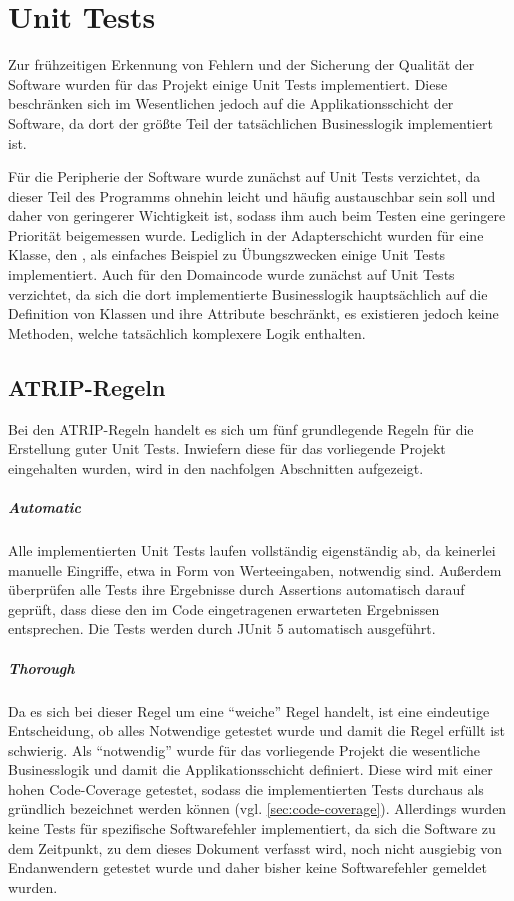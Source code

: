 \chapter{Unit Tests}
Zur frühzeitigen Erkennung von Fehlern und der Sicherung der Qualität der Software wurden für das Projekt einige Unit Tests implementiert. Diese beschränken sich im Wesentlichen jedoch auf die Applikationsschicht der Software, da dort der größte Teil der tatsächlichen Businesslogik implementiert ist. 

Für die Peripherie der Software wurde zunächst auf Unit Tests verzichtet, da dieser Teil des Programms ohnehin leicht und häufig austauschbar sein soll und daher von geringerer Wichtigkeit ist, sodass ihm auch beim Testen eine geringere Priorität beigemessen wurde. Lediglich in der Adapterschicht wurden für eine Klasse, den , als einfaches Beispiel zu Übungszwecken einige Unit Tests implementiert. Auch für den Domaincode wurde zunächst auf Unit Tests verzichtet, da sich die dort implementierte Businesslogik hauptsächlich auf die Definition von Klassen und ihre Attribute beschränkt, es existieren jedoch keine Methoden, welche tatsächlich komplexere Logik enthalten.

\section{ATRIP-Regeln}
Bei den ATRIP-Regeln handelt es sich um fünf grundlegende Regeln für die Erstellung guter Unit Tests. Inwiefern diese für das vorliegende Projekt eingehalten wurden, wird in den nachfolgen Abschnitten aufgezeigt.

\paragraph{Automatic} Alle implementierten Unit Tests laufen vollständig eigenständig ab, da keinerlei manuelle Eingriffe, etwa in Form von Werteeingaben, notwendig sind. Außerdem überprüfen alle Tests ihre Ergebnisse durch Assertions automatisch darauf geprüft, dass diese den im Code eingetragenen erwarteten Ergebnissen entsprechen. Die Tests werden durch JUnit 5 automatisch ausgeführt.

\paragraph{Thorough} Da es sich bei dieser Regel um eine \enquote{weiche} Regel handelt, ist eine eindeutige Entscheidung, ob alles Notwendige getestet wurde und damit die Regel erfüllt ist schwierig. Als \enquote{notwendig} wurde für das vorliegende Projekt die wesentliche Businesslogik und damit die Applikationsschicht definiert. Diese wird mit einer hohen Code-Coverage getestet, sodass die implementierten Tests durchaus als gründlich bezeichnet werden können (vgl. \autoref{sec:code-coverage}). Allerdings wurden keine Tests für spezifische Softwarefehler implementiert, da sich die Software zu dem Zeitpunkt, zu dem dieses Dokument verfasst wird, noch nicht ausgiebig von Endanwendern getestet wurde und daher bisher keine Softwarefehler gemeldet wurden.

